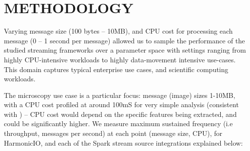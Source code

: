 \documentclass[letterpaper,conference]{IEEEtran}
\begin{document}

\section{METHODOLOGY}\label{method}


Varying message size (100 bytes -- 10MB), and CPU cost for processing each message (0 -- 1 second per message)
allowed us to sample the performance of the studied streaming frameworks over a parameter space with settings ranging from highly CPU-intensive workloads to highly data-movement intensive use-cases. This domain captures typical enterprise use cases, and scientific computing workloads.





The microscopy use case is a particular focus: message (image) sizes 1-10MB, with a CPU cost profiled at around 100mS for very simple analysis (consistent with \cite{torruangwatthanaHarmonicIOScalableData2018a}) -- CPU cost would depend on the specific features being extracted, and could be significantly higher.
We measure maximum sustained frequency (i.e throughput, messages per second) at each point (message size, CPU), for HarmonicIO, and each of the Spark stream source integrations explained below:%
\end{document}
